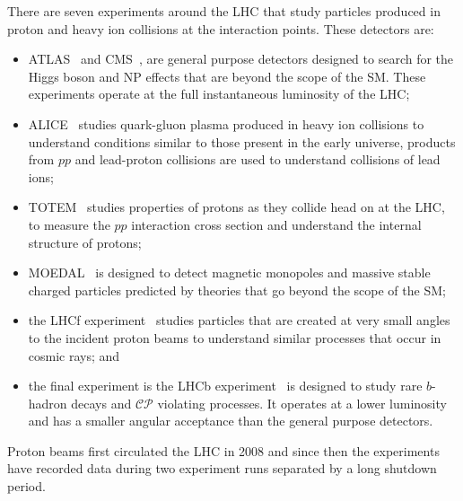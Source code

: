 There are seven experiments around the LHC that study particles produced in proton and heavy ion collisions at the interaction points. These detectors are: %
\begin{itemize}
\item ATLAS~\cite{Aad:2008zzm} and CMS~\cite{Chatrchyan:2008aa}, are general purpose detectors designed to search for the Higgs boson and NP effects that are beyond the scope of the SM. These experiments operate at the full instantaneous luminosity of the LHC; %
\item ALICE~\cite{Aamodt:2008zz} studies quark-gluon plasma produced in heavy ion collisions to understand conditions similar to those present in the early universe, products from $pp$ and lead-proton collisions are used to understand collisions of lead ions;
\item  TOTEM~\cite{Anelli:2008zza} studies properties of protons as they collide head on at the LHC, to measure the $pp$ interaction cross section and understand the internal structure of protons; %
\item MOEDAL~\cite{Pinfold:2009oia} is designed to detect magnetic monopoles and massive stable charged particles predicted by theories that go beyond the scope of the SM;
\item the LHCf experiment~\cite{Adriani:2008zz} studies particles that are created at very small angles to the incident proton beams to understand similar processes that occur in cosmic rays; and %
\item the final experiment is the LHCb experiment~\cite{Alves:2008zz} is designed to study rare $b$-hadron decays and $\mathcal{CP}$ violating processes. It operates at a lower luminosity and has a smaller angular acceptance than the general purpose detectors. 
\end{itemize}
Proton beams first circulated the LHC in 2008 and since then the experiments have recorded data during two experiment runs separated by a long shutdown period.
